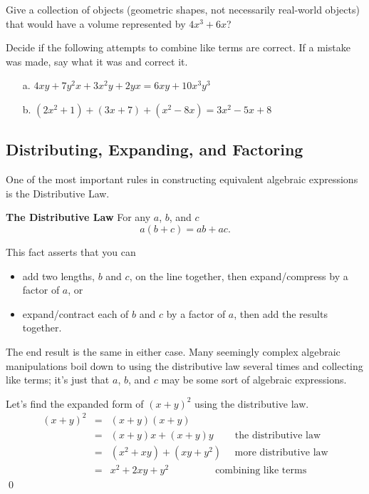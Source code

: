\begin{question} Give a collection of objects (geometric shapes, not necessarily real-world objects) that would have a volume represented by $4x^3 + 6x$?
\end{question}

\begin{question} Decide if the following attempts to combine like terms are correct. If a mistake was made, say what it was and correct it.
\begin{enumerate}
\item[a.] $4xy+7y^2x + 3x^2y +2yx = 6xy + 10x^3y^3$
\item[b.] $(2x^2+1) + (3x+7) + (x^2-8x) = 3x^2-5x+8$
\end{enumerate} 
\end{question}  

\subsection{Distributing, Expanding, and Factoring}

One of the most important rules in constructing equivalent algebraic expressions is the Distributive Law.

\begin{tcolorbox}
{\bf The Distributive Law}
For any $a$, $b$, and $c$
\[
a(b+c) = ab+ac.
\] 
\end{tcolorbox}

This fact asserts that you can
\begin{itemize}
\item add two lengths, $b$ and $c$, on the line together, then expand/compress by a factor of $a$, or
\item expand/contract each of $b$ and $c$ by a factor of $a$, then add the results together. 
\end{itemize}
The end result is the same in either case. Many seemingly complex algebraic manipulations boil down to using the distributive law several times and collecting like terms; it's just that $a$, $b$, and $c$ may be some sort of algebraic expressions.

\par 

\begin{eg} Let's find the expanded form of $(x+y)^2$ using the distributive law. 
\begin{eqnarray*}
(x+y)^2 & = & (x+y)(x+y)\\
 & = & (x+y)x + (x+y)y  \phantom{www} \mbox{the distributive law}\\
 & = & (x^2+xy) + (xy+y^2) \phantom{wn} \mbox{more distributive law}\\
 & = & x^2+2xy+y^2 \phantom{wwwwwwi} \mbox{combining like terms}
\end{eqnarray*}\qed
\end{eg}
\par 

